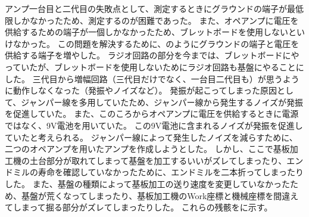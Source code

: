 \documentclass[report.tex]{subfiles}
\begin{document}
アンプ一台目と二代目の失敗点として、測定するときにグラウンドの端子が最低限しかなかったため、測定するのが困難であった。
また、オペアンプに電圧を供給するための端子が一個しかなかったため、ブレットボードを使用しないといけなかった。
この問題を解決するために、のようにグラウンドの端子と電圧を供給する端子を増やした。
ラジオ回路の部分を今までは、ブレットボードにやっていたが、ブレットボードを使用しないためにラジオ回路も基盤にやることにした。
三代目から増幅回路（三代目だけでなく、一台目二代目も）が思うように動作しなくなった（発振やノイズなど）。
発振が起こってしまった原因として、ジャンパー線を多用していたため、ジャンパー線から発生するノイズが発振を促進していた。
また、このころからオペアンプに電圧を供給するときに電源ではなく、9V電池を用いていた。
この9V電池に含まれるノイズが発振を促進していたと考えられる。
ジャンパー線によって発生したノイズを減らすために、二つのオペアンプを用いたアンプを作成しようとした。
しかし、ここで基板加工機の土台部分が取れてしまって基盤を加工するいいがズレてしまったり、エンドミルの寿命を確認していなかったために、エンドミルを二本折ってしまったりした。
また、基盤の種類によって基板加工の送り速度を変更していなかったため、基盤が荒くなってしまったり、基板加工機のWork座標と機械座標を間違えてしまって掘る部分がズレてしまったりした。
これらの残骸をに示す。
\end{document}
